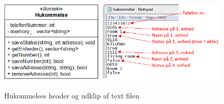 \begin{figure}[htbp] \centering
{\includegraphics[width=\textwidth]{billeder/uml/pc_dataview}}
\caption{Hukommelses header og udklip af text filen}
\label{fig:Hukommelses header og udklip af text filen}
\end{figure}